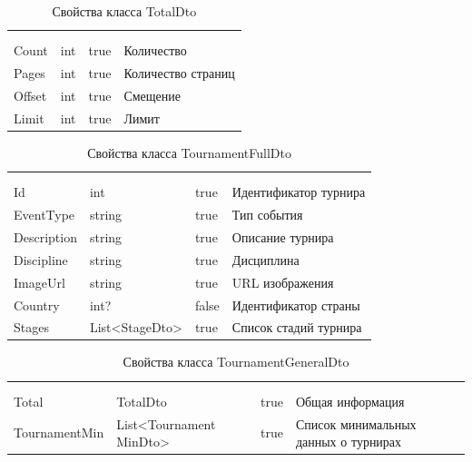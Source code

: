 \begin{xltabular}{\textwidth}{|X|X|X|X|}
	\caption{Свойства класса TotalDto}\label{table:TotalDto}\\ \hline
	 &  &  &  \\ \hline
	 &  &  &  \\ \hline
	\endfirsthead
	 \hline
	 &  &  &  \\ \hline
	\endhead
	Count & int & true & Количество \\ \hline
	Pages & int & true & Количество страниц \\ \hline
	Offset & int & true & Смещение \\ \hline
	Limit & int & true & Лимит \\ \hline
\end{xltabular}

\begin{xltabular}{\textwidth}{|X|X|X|X|}
	\caption{Свойства класса TournamentFullDto}\label{table:TournamentFullDto}\\ \hline
	 &  &  &  \\ \hline
	 &  &  &  \\ \hline
	\endfirsthead
	 \hline
	 &  &  &  \\ \hline
	\endhead
	Id & int & true & Идентификатор турнира \\ \hline
	EventType & string & true & Тип события \\ \hline
	Description & string & true & Описание турнира \\ \hline
	Discipline & string & true & Дисциплина \\ \hline
	ImageUrl & string & true & URL изображения \\ \hline
	Country & int? & false & Идентификатор страны \\ \hline
	Stages & List<StageDto> & true & Список стадий турнира \\ \hline
\end{xltabular}

\begin{xltabular}{\textwidth}{|X|X|X|X|}
	\caption{Свойства класса TournamentGeneralDto}\label{table:TournamentGeneralDto}\\ \hline
	 &  &  &  \\ \hline
	 &  &  &  \\ \hline
	\endfirsthead
	 \hline
	 &  &  &  \\ \hline
	\endhead
	Total & TotalDto & true & Общая информация \\ \hline
	TournamentMin & List<Tournament
	MinDto> & true & Список минимальных данных о турнирах \\ \hline
\end{xltabular}

